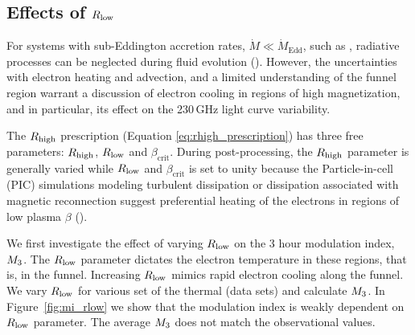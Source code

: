 %
\subsection{Effects of \texorpdfstring{$R_\mathrm{low}$}{Rl} } %

For systems with sub-Eddington accretion rates, $\Dot{M}\ll\Dot{M}_\mathrm{Edd}$, such as \sgra, radiative processes can be neglected during fluid evolution (\citealt{2012MNRAS.426.1928D, 10.1093/mnras/stw3116, Ryan_2017}).
However, the uncertainties with electron heating and advection, and a limited understanding of the funnel region warrant a discussion of electron cooling in regions of high magnetization, and in particular, its effect on the 230\,GHz light curve variability.

The $R_\mathrm{high}$ prescription (Equation \ref{eq:rhigh_prescription}) has three free parameters: $R_\mathrm{high}$, $R_\mathrm{low}$ and $\beta_\mathrm{crit}$. During post-processing, the $R_\mathrm{high}$ parameter is generally varied while $R_\mathrm{low}$ and $\beta_\mathrm{crit}$ is set to unity because the Particle-in-cell (PIC) simulations modeling turbulent dissipation or dissipation associated with magnetic reconnection suggest preferential heating of the electrons in regions of low plasma $\beta$ (\citealt{2010MNRAS.409L.104H, Rowan_2017, 10.1093/mnras/stx2530, Rowan_2019, Kawazura771, PhysRevX.10.041050, kawazura2021energy}).

We first investigate the effect of varying $R_\mathrm{low}$ on the 3 hour modulation index, $M_{3}$. The $R_\mathrm{low}$ parameter dictates the electron temperature in these regions, that is, in the funnel. Increasing $R_\mathrm{low}$ mimics rapid electron cooling along the funnel.
We vary $R_\mathrm{low}$ for various set of the thermal (\kharma data sets) and calculate $M_{3}$. In Figure~\ref{fig:mi_rlow} we show that the modulation index is weakly dependent on $R_\mathrm{low}$ parameter.
The average $M_{3}$ does not match the observational values.


